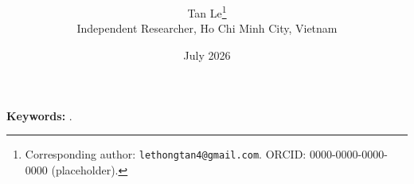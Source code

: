 \documentclass[11pt]{article}
\title{\textbf{\PaperTitle}}
\author{Tan Le\thanks{Corresponding author: \texttt{lethongtan4@gmail.com}.
ORCID: 0000-0000-0000-0000 (placeholder).}\\[2pt]
\small Independent Researcher, Ho Chi Minh City, Vietnam}
\date{July 2026}\fi
\begin{document}
\maketitle
\begin{abstract}\PaperAbstract\end{abstract}
\noindent\textbf{Keywords:} \PaperKeywordsComma.
\medskip


\end{document}
